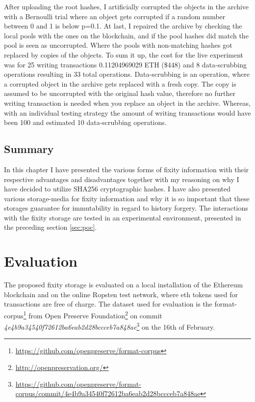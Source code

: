 \documentclass[final]{vutinfth}
\begin{document}
After uploading the root hashes, I artificially corrupted the objects in the archive with a Bernoulli trial where an object gets corrupted if a random number between 0 and 1 is below p=0.1. At last, I repaired the archive by checking the local pools with the ones on the blockchain, and if the pool hashes did match the pool is seen as uncorrupted. Where the pools with non-matching hashes got replaced by copies of the objects.
To sum it up, the cost for the live experiment was for 25 writing transactions 0.11204969029 ETH (\$448) and 8 data-scrubbing operations resulting in 33 total operations. Data-scrubbing is an operation, where a corrupted object in the archive gets replaced with a fresh copy. The copy is assumed to be uncorrupted with the original hash value, therefore no further writing transaction is needed when you replace an object in the archive. Whereas, with an individual testing strategy the amount of writing transactions would have been 100 and estimated 10 data-scrubbing operations.

\section{Summary}
In this chapter I have presented the various forms of fixity information with their respective advantages and disadvantages together with my reasoning on why I have decided to utilize SHA256 cryptographic hashes. I have also presented various storage-media for fixity information and why it is so important that these storages guarantee for immutability in regard to history forgery. The interactions with the fixity storage are tested in an experimental environment, presented in the preceding section \ref{sec:poc}. \chapter{Evaluation}
\label{ch:evaluation}
The proposed fixity storage is evaluated on a local installation of the Ethereum blockchain and on the online Ropsten test network, where \acrshort{eth} tokens used for transactions are free of charge. The dataset used for evaluation is the format-corpus\footnote{\url{https://github.com/openpreserve/format-corpus}} from Open Preserve Foundation\footnote{\url{ http://openpreservation.org/}} on commit \textit{4e4b9a34540f72612ba6eab2d28bccceb7a848ae}\footnote{\url{https://github.com/openpreserve/format-corpus/commit/4e4b9a34540f72612ba6eab2d28bccceb7a848ae}} on the 16th of February.
\end{document}
